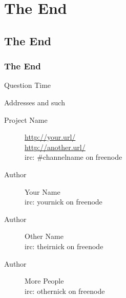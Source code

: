 \documentclass[t,compress,aspectratio=169]{beamer}
\begin{document}



\section{The End}
\subsection{The End}
\begin{frame}
    \frametitle{The End}
    \vspace{0.3cm}
    \begin{block}{}
        \centering\begin{Huge}Question Time\end{Huge}
    \end{block}
    \vspace{1.1cm}
    \begin{tiny}
        \begin{block}{Addresses and such}
            \begin{description}
                \item[Project Name] \url{http://your.url/}\\ \url{http://another.url/}\\ irc: \#channelname on freenode
                \item[Author] Your Name\\irc: yournick on freenode
                \item[Author] Other Name\\irc: theirnick on freenode
                \item[Author] More People\\irc: othernick on freenode
            \end{description}
        \end{block}
    \end{tiny}
\end{frame}


% 
% 
\end{document}
